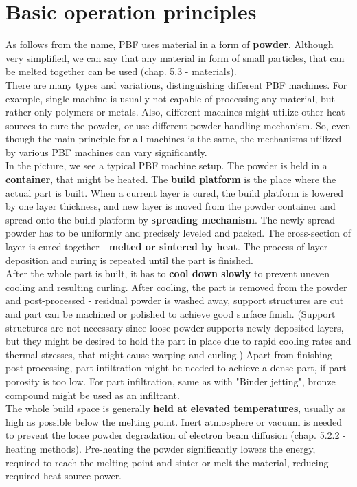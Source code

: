 \documentclass[a4paper, twoside, 11pt]{report}
\begin{document}
\section{Basic operation principles}
As follows from the name, PBF uses material in a form of \textbf{powder}. Although very simplified, we can say that any material in form of small particles, that can be melted together can be used (chap. 5.3 - materials).\\
	There are many types and variations, distinguishing different PBF machines. For example, single machine is usually not capable of processing any material, but rather only polymers or metals. Also, different machines might utilize other heat sources to cure the powder, or use different powder handling mechanism. So, even though the main principle for all machines is the same, the mechanisms utilized by various PBF machines can vary significantly.
\\
In the picture, we see a typical PBF machine setup. The powder is held in a \textbf{container}, that might be heated. The \textbf{build platform} is the place where the actual part is built. When a current layer is cured, the build platform is lowered by one layer thickness, and new layer is moved from the powder container and spread onto the build platform by \textbf{spreading mechanism}. The newly spread powder has to be uniformly and precisely leveled and packed. The cross-section of layer is cured together - \textbf{melted or sintered by heat}. The process of layer deposition and curing is repeated until the part is finished.\\
	After the whole part is built, it has to \textbf{cool down slowly} to prevent uneven cooling and resulting curling. After cooling, the part is removed from the powder and post-processed - residual powder is washed away, support structures are cut and part can be machined or polished to achieve good surface finish. (Support structures are not necessary since loose powder supports newly deposited layers, but they might be desired to hold the part in place due to rapid cooling rates and thermal stresses, that might cause warping and curling.) Apart from finishing post-processing, part infiltration might be needed to achieve a dense part, if part porosity is too low. For part infiltration, same as with "Binder jetting", bronze compound might be used as an infiltrant.\\
	The whole build space is generally \textbf{held at elevated temperatures}, usually as high as possible below the melting point. Inert atmosphere or vacuum is needed to prevent the loose powder degradation of electron beam diffusion (chap. 5.2.2 - heating methods). Pre-heating the powder significantly lowers the energy, required to reach the melting point and sinter or melt the material, reducing required heat source power.
	
\end{document}
